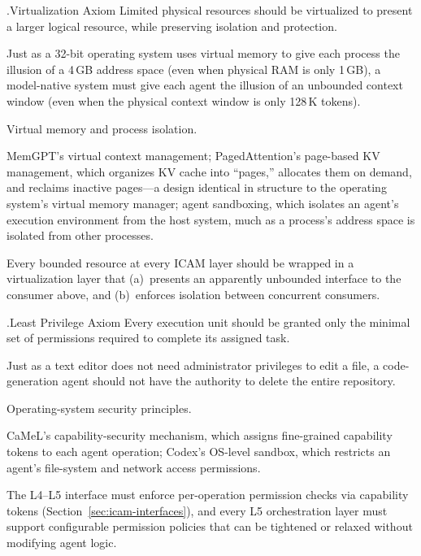 \documentclass[11pt,a4paper]{article}
\newcounter{axiom}[section]
\renewcommand{\theaxiom}{\thesection.\arabic{axiom}}
\begin{document}
\begin{axiombox}{\theaxiom\enspace Virtualization Axiom}
Limited physical resources should be virtualized to present a larger logical resource, while preserving isolation and protection.
\end{axiombox}
\begin{description}[style=nextline,leftmargin=2em,font=\bfseries]
\item[Intuition] Just as a 32-bit operating system uses virtual memory to give each process the illusion of a 4\,GB address space (even when physical RAM is only 1\,GB), a model-native system must give each agent the illusion of an unbounded context window (even when the physical context window is only 128\,K tokens).
\item[Classical source] Virtual memory and process isolation\cite{ostep_2023}.
\item[ICAM embodiment] MemGPT's virtual context management\cite{memgpt2023}; PagedAttention's page-based KV management\cite{kwon2023pagedattention}, which organizes KV cache into ``pages,'' allocates them on demand, and reclaims inactive pages---a design identical in structure to the operating system's virtual memory manager; agent sandboxing\cite{openai_codex_sandbox_2026}, which isolates an agent's execution environment from the host system, much as a process's address space is isolated from other processes.
\item[Design implication] Every bounded resource at every ICAM layer should be wrapped in a virtualization layer that (a)~presents an apparently unbounded interface to the consumer above, and (b)~enforces isolation between concurrent consumers.
\end{description}

\begin{axiombox}{\theaxiom\enspace Least Privilege Axiom}
Every execution unit should be granted only the minimal set of permissions required to complete its assigned task.
\end{axiombox}
\begin{description}[style=nextline,leftmargin=2em,font=\bfseries]
\item[Intuition] Just as a text editor does not need administrator privileges to edit a file, a code-generation agent should not have the authority to delete the entire repository.
\item[Classical source] Operating-system security principles\cite{ostep_2023}.
\item[ICAM embodiment] CaMeL's capability-security mechanism\cite{debenedetti2025camel}, which assigns fine-grained capability tokens to each agent operation; Codex's OS-level sandbox\cite{openai_codex_security_2026}, which restricts an agent's file-system and network access permissions.
\item[Design implication] The L4--L5 interface must enforce per-operation permission checks via capability tokens (Section~\ref{sec:icam-interfaces}), and every L5 orchestration layer must support configurable permission policies that can be tightened or relaxed without modifying agent logic.
\end{description}
\end{document}
